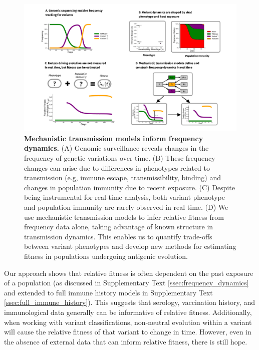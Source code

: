 \documentclass[11pt,oneside,letterpaper]{article}
\begin{document}
\begin{figure}[h]
    \centering
    \includegraphics[width=1.0\linewidth]{./figures/vis-mechanisms-sketch.png}
    \caption{
      \textbf{Mechanistic transmission models inform frequency dynamics.}
      (A) Genomic surveillance reveals changes in the frequency of genetic variations over time.
      (B) These frequency changes can arise due to differences in phenotypes related to transmission (e.g, immune escape, transmissibility, binding) and changes in population immunity due to recent exposure.
      (C) Despite being instrumental for real-time analysis, both variant phenotype and population immunity are rarely observed in real time.
      (D) We use mechanistic transmission models to infer relative fitness from frequency data alone, taking advantage of known structure in transmission dynamics. This enables us to quantify trade-offs between variant phenotypes and develop new methods for estimating fitness in populations undergoing antigenic evolution.
    }
    \label{fig:vis_mechanisms-sketch}
\end{figure}


Our approach shows that relative fitness is often dependent on the past exposure of a population (as discussed in Supplementary Text \ref{ssec:frequency_dynamics} and extended to full immune history models in Supplementary Text \ref{ssec:full_immune_history}).
This suggests that serology, vaccination history, and immunological data generally can be informative of relative fitness.
Additionally, when working with variant classifications, non-neutral evolution within a variant will cause the relative fitness of that variant to change in time.
However, even in the absence of external data that can inform relative fitness, there is still hope.
\end{document}
